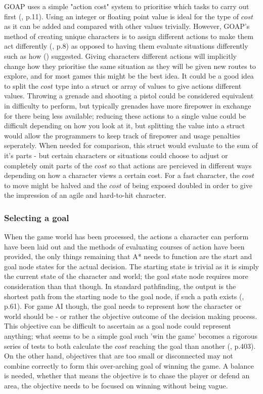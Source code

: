 \documentclass[11pt, a4paper]{article}
\begin{document}
GOAP uses a simple "action cost" system to prioritise which tasks to carry out first (\cite{orkin2006three}, p.11). Using an integer or floating point value is ideal for the type of $cost$ as it can be added and compared with other values trivially. However, GOAP's method of creating unique characters is to assign different actions to make them act differently (\cite{orkin2006three}, p.8) as opposed to having them evaluate situations differently such as how \citeauthor{millington2019ai} (\citeyear{millington2019ai}) suggested. Giving characters different actions will implicitly change how they prioritise the same situation as they will be given new routes to explore, and for most games this might be the best idea. It could be a good idea to split the $cost$ type into a struct or array of values to give actions different values. Throwing a grenade and shooting a pistol could be considered equivalent in difficulty to perform, but typically grenades have more firepower in exchange for there being less available; reducing these actions to a single value could be difficult depending on how you look at it, but splitting the value into a struct would allow the programmers to keep track of firepower and usage penalties seperately. When needed for comparison, this struct would evaluate to the sum of it's parts - but certain characters or situations could choose to adjust or completely omit parts of the $cost$ so that actions are percieved in different ways depending on how a character views a certain cost. For a fast character, the $cost$ to move might be halved and the $cost$ of being exposed doubled in order to give the impression of an agile and hard-to-hit character.

\subsubsection{Selecting a goal}

When the game world has been processed, the actions a character can perform have been laid out and the methods of evaluating courses of action have been provided, the only things remaining that A* needs to function are the start and goal node states for the actual decision. The starting state is trivial as it is simply the current state of the character and world; the goal state node requires more consideration than that though. In standard pathfinding, the output is the shortest path from the starting node to the goal node, if such a path exists (\cite{nareyek2004ai}, p.61). For game AI though, the goal needs to represent how the character or world should be - or rather the objective outcome of the decision making process. This objective can be difficult to ascertain as a goal node could represent anything; what seems to be a simple goal such 'win the game' becomes a rigorous series of tests to both calculate the $cost$ reaching the goal than another (\cite{harmon2002economic}, p.403). On the other hand, objectives that are too small or disconnected may not combine correctly to form this over-arching goal of winning the game. A balance is needed, whether that means the objective is to chase the player or defend an area, the objective needs to be focused on winning without being vague.
\end{document}
